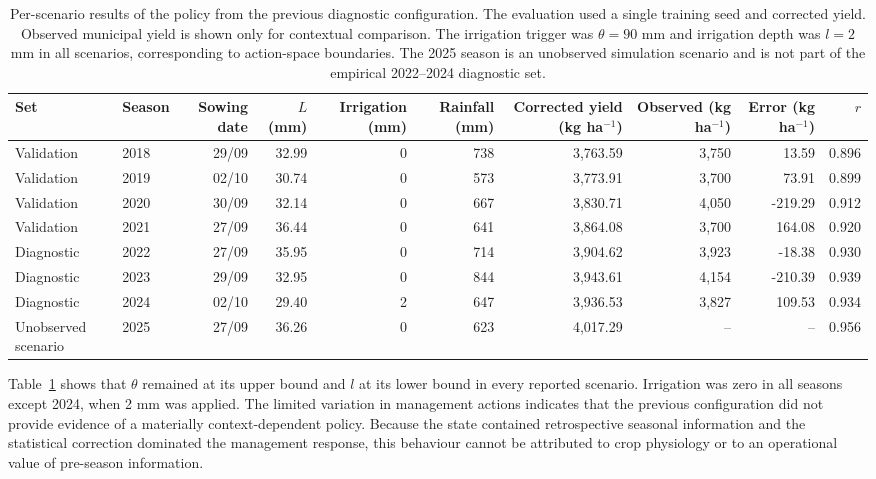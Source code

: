 \documentclass[times,final,authoryear]{elsarticle}
\begin{document}
\begin{table}[!h]
\centering
\scriptsize
\caption{Per-scenario results of the policy from the previous diagnostic configuration. The evaluation used a single training seed and corrected yield. Observed municipal yield is shown only for contextual comparison. The irrigation trigger was $\theta=90$ mm and irrigation depth was $l=2$ mm in all scenarios, corresponding to action-space boundaries. The 2025 season is an unobserved simulation scenario and is not part of the empirical 2022--2024 diagnostic set.}
\label{tab_ppo_scenarios}
\begin{tabular}{llrrrrrrrr}
\hline
Set & Season & Sowing date & $L$ (mm) & Irrigation (mm) & Rainfall (mm) & Corrected yield (kg ha$^{-1}$) & Observed (kg ha$^{-1}$) & Error (kg ha$^{-1}$) & $r$ \\
\hline
Validation & 2018 & 29/09 & 32.99 & 0 & 738 & 3,763.59 & 3,750 & 13.59   & 0.896 \\
Validation & 2019 & 02/10 & 30.74 & 0 & 573 & 3,773.91 & 3,700 & 73.91   & 0.899 \\
Validation & 2020 & 30/09 & 32.14 & 0 & 667 & 3,830.71 & 4,050 & -219.29 & 0.912 \\
Validation & 2021 & 27/09 & 36.44 & 0 & 641 & 3,864.08 & 3,700 & 164.08  & 0.920 \\
Diagnostic & 2022 & 27/09 & 35.95 & 0 & 714 & 3,904.62 & 3,923 & -18.38  & 0.930 \\
Diagnostic & 2023 & 29/09 & 32.95 & 0 & 844 & 3,943.61 & 4,154 & -210.39 & 0.939 \\
Diagnostic & 2024 & 02/10 & 29.40 & 2 & 647 & 3,936.53 & 3,827 & 109.53  & 0.934 \\
Unobserved scenario & 2025 & 27/09 & 36.26 & 0 & 623 & 4,017.29 & -- & -- & 0.956 \\
\hline
\end{tabular}
\end{table}

Table~\ref{tab_ppo_scenarios} shows that $\theta$ remained at its upper bound and $l$ at its lower bound in every reported scenario. Irrigation was zero in all seasons except 2024, when 2 mm was applied. The limited variation in management actions indicates that the previous configuration did not provide evidence of a materially context-dependent policy. Because the state contained retrospective seasonal information and the statistical correction dominated the management response, this behaviour cannot be attributed to crop physiology or to an operational value of pre-season information.
\end{document}
